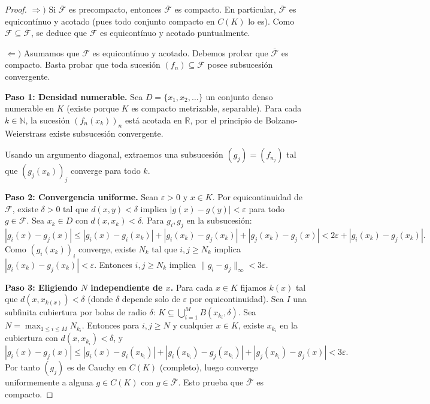 \documentclass[11pt,a4paper]{article}
\theoremstyle{plain}
\theoremstyle{definition}
\begin{document}
\begin{proof}
$\Rightarrow)$ Si $\overline{\mathcal{F}}$ es precompacto, entonces $\overline{\mathcal{F}}$ es compacto. En particular, $\overline{\mathcal{F}}$ es equicontínuo y acotado (pues todo conjunto compacto en $C(K)$ lo es). Como $\mathcal{F}\subseteq\overline{\mathcal{F}}$, se deduce que $\mathcal{F}$ es equicontínuo y acotado puntualmente.

$\Leftarrow)$ Asumamos que $\mathcal{F}$ es equicontínuo y acotado. Debemos probar que $\overline{\mathcal{F}}$ es compacto. Basta probar que toda sucesión $(f_{n})\subseteq\mathcal{F}$ posee subsucesión convergente.

\textbf{Paso 1: Densidad numerable.} Sea $D=\{x_{1},x_{2},\dots\}$ un conjunto denso numerable en $K$ (existe porque $K$ es compacto metrizable, separable). Para cada $k\in\mathbb{N}$, la sucesión $(f_{n}(x_{k}))_{n}$ está acotada en $\mathbb{R}$, por el principio de Bolzano-Weierstrass existe subsucesión convergente.

Usando un argumento diagonal, extraemos una subsucesión $(g_{j})=(f_{n_{j}})$ tal que $(g_{j}(x_{k}))_{j}$ converge para todo $k$.

\textbf{Paso 2: Convergencia uniforme.} Sean $\varepsilon>0$ y $x\in K$. Por equicontinuidad de $\mathcal{F}$, existe $\delta>0$ tal que $d(x,y)<\delta$ implica $|g(x)-g(y)|<\varepsilon$ para todo $g\in\mathcal{F}$. Sea $x_{k}\in D$ con $d(x,x_{k})<\delta$. Para $g_{i},g_{j}$ en la subsucesión:
\[
|g_{i}(x)-g_{j}(x)|\le|g_{i}(x)-g_{i}(x_{k})|+|g_{i}(x_{k})-g_{j}(x_{k})|+|g_{j}(x_{k})-g_{j}(x)|<2\varepsilon+|g_{i}(x_{k})-g_{j}(x_{k})|.
\]
Como $(g_{i}(x_{k}))_{i}$ converge, existe $N_{k}$ tal que $i,j\ge N_{k}$ implica $|g_{i}(x_{k})-g_{j}(x_{k})|<\varepsilon$. Entonces $i,j\ge N_{k}$ implica $\|g_{i}-g_{j}\|_{\infty}<3\varepsilon$.

\textbf{Paso 3: Eligiendo $N$ independiente de $x$.} Para cada $x\in K$ fijamos $k(x)$ tal que $d(x,x_{k(x)})<\delta$ (donde $\delta$ depende solo de $\varepsilon$ por equicontinuidad). Sea $I$ una subfinita cubiertura por bolas de radio $\delta$: $K\subseteq\bigcup_{i=1}^{M}B(x_{k_{i}},\delta)$. Sea $N=\max_{1\le i\le M}N_{k_{i}}$. Entonces para $i,j\ge N$ y cualquier $x\in K$, existe $x_{k_{i}}$ en la cubiertura con $d(x,x_{k_{i}})<\delta$, y
\[
|g_{i}(x)-g_{j}(x)|\le|g_{i}(x)-g_{i}(x_{k_{i}})|+|g_{i}(x_{k_{i}})-g_{j}(x_{k_{i}})|+|g_{j}(x_{k_{i}})-g_{j}(x)|<3\varepsilon.
\]
Por tanto $(g_{j})$ es de Cauchy en $C(K)$ (completo), luego converge uniformemente a alguna $g\in C(K)$ con $g\in\overline{\mathcal{F}}$. Esto prueba que $\overline{\mathcal{F}}$ es compacto.
\end{proof}
\end{document}

